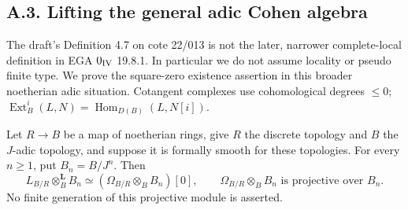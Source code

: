 \subsection{A.3. Lifting the general adic Cohen algebra}
\label{subsec:A3}

The draft's Definition 4.7 on cote 22/013 is not the later, narrower
complete-local definition in EGA $0_{\rm IV}$ 19.8.1. In particular we
do not assume locality or pseudo finite type. We prove the square-zero
existence assertion in this broader noetherian adic situation.
Cotangent complexes use cohomological degrees $\leq0$;
$\operatorname{Ext}^i_B(L,N)=\operatorname{Hom}_{D(B)}(L,N[i])$.

\begin{lemma}
\label{SA23-A-14}
Let $R\to B$ be a map of noetherian rings, give $R$ the discrete
topology and $B$ the $J$-adic topology, and suppose it is formally
smooth for these topologies. For every $n\geq1$, put $B_n=B/J^n$.
Then
\[
 L_{B/R}\otimes_B^{\mathbf L}B_n
 \simeq(\Omega_{B/R}\otimes_B B_n)[0],
 \qquad \Omega_{B/R}\otimes_B B_n\text{ is projective over }B_n.
\]
No finite generation of this projective module is asserted.
\end{lemma}
